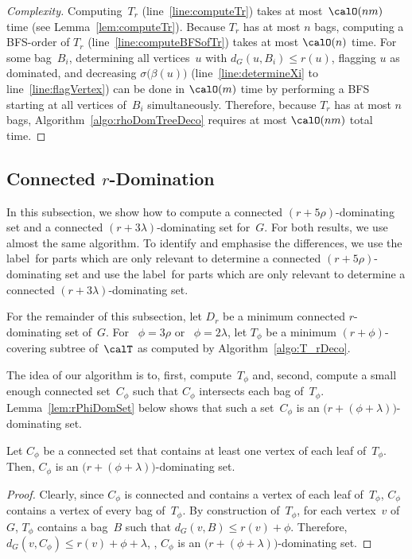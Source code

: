 \begin{proof}
    [Complexity]
Computing~$T_r$ (line~\ref{line:computeTr}) takes at most~$\calO(nm)$ time (see Lemma~\ref{lem:computeTr}).
Because $T_r$ has at most $n$ bags, computing a BFS-order of $T_r$ (line~\ref{line:computeBFSofTr}) takes at most $\calO(n)$ time.
For some bag~$B_i$, determining all vertices~$u$ with $d_G(u, B_i) \leq r(u)$, flagging $u$ as dominated, and decreasing $\sigma \big( \beta(u) \big)$ (line~\ref{line:determineXi} to line~\ref{line:flagVertex}) can be done in $\calO(m)$ time by performing a BFS starting at all vertices of~$B_i$ simultaneously.
Therefore, because $T_r$ has at most $n$ bags, Algorithm~\ref{algo:rhoDomTreeDeco} requires at most $\calO(nm)$ total time.
\end{proof}


\subsection{Connected $r$-Domination}

In this subsection, we show how to compute a connected $(r + 5 \rho)$-dominating set and a connected $(r + 3 \lambda)$-dominating set for~$G$.
For both results, we use almost the same algorithm.
To identify and emphasise the differences, we use the label~\rHrt for parts which are only relevant to determine a connected $(r + 5 \rho)$-dominating set and use the label~\rDmd for parts which are only relevant to determine a connected $(r + 3 \lambda)$-dominating set.

For the remainder of this subsection, let $D_r$ be a minimum connected $r$-dominating set of~$G$.
For \rHrt~$\phi = 3 \rho$ or \rDmd~$\phi = 2 \lambda$, let $T_\phi$ be a minimum $(r + \phi)$-covering subtree of~$\calT$ as computed by Algorithm~\ref{algo:T_rDeco}.

The idea of our algorithm is to, first, compute~$T_\phi$ and, second, compute a small enough connected set~$C_\phi$ such that $C_\phi$ intersects each bag of~$T_\phi$.
Lemma~\ref{lem:rPhiDomSet} below shows that such a set~$C_\phi$ is an $\big( r + (\phi + \lambda) \big)$-dominating set.

\begin{lemma}
    \label{lem:rPhiDomSet}
Let \( C_\phi \) be a connected set that contains at least one vertex of each leaf of~\( T_\phi \).
Then, \( C_\phi \) is an \( \big( r + (\phi + \lambda) \big) \)-dominating set.
\end{lemma}

\begin{proof}
Clearly, since $C_\phi$ is connected and contains a vertex of each leaf of~$T_\phi$, $C_\phi$ contains a vertex of every bag of~$T_\phi$.
By construction of~$T_\phi$, for each vertex~$v$ of~$G$, $T_\phi$ contains a bag~$B$ such that $d_G(v, B) \leq r(v) + \phi$.
Therefore, $d_G(v, C_\phi) \leq r(v) + \phi + \lambda$, \ie, $C_\phi$ is an $\big( r + (\phi + \lambda) \big)$-dominating set.
\end{proof}

